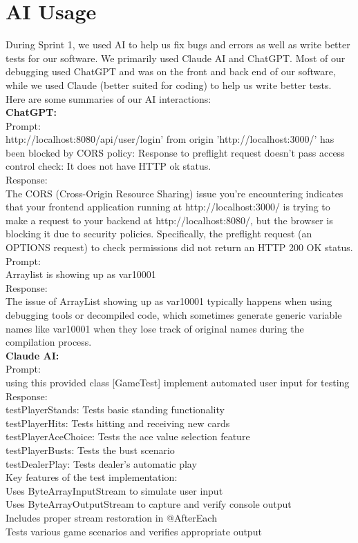 \section{AI Usage}
\setlength{\parindent}{0pt}
During Sprint 1, we used AI to help us fix bugs and errors as well as write better tests for our software. We primarily used Claude AI and ChatGPT. Most of our debugging used ChatGPT and was on the front and back end of our software, while we used Claude (better suited for coding) to help us write better tests.\\

Here are some summaries of our AI interactions:\\

\textbf{ChatGPT:}\\

Prompt:\\
http://localhost:8080/api/user/login' from origin 'http://localhost:3000/' has been blocked by CORS policy: Response to preflight request doesn't pass access control check: It does not have HTTP ok status.\\

Response:\\
The CORS (Cross-Origin Resource Sharing) issue you’re encountering indicates that your frontend application running at http://localhost:3000/ is trying to make a request to your backend at http://localhost:8080/, but the browser is blocking it due to security policies. Specifically, the preflight request (an OPTIONS request) to check permissions did not return an HTTP 200 OK status. \\

Prompt:\\
Arraylist is showing up as var10001\\

Response:\\
The issue of ArrayList showing up as var10001 typically happens when using debugging tools or decompiled code, which sometimes generate generic variable names like var10001 when they lose track of original names during the compilation process.\\

\textbf{Claude AI:}\\

Prompt:\\
using this provided class [GameTest] implement automated user input for testing\\

Response:\\
testPlayerStands: Tests basic standing functionality\\
testPlayerHits: Tests hitting and receiving new cards\\
testPlayerAceChoice: Tests the ace value selection feature\\
testPlayerBusts: Tests the bust scenario\\
testDealerPlay: Tests dealer's automatic play\\

Key features of the test implementation:\\

Uses ByteArrayInputStream to simulate user input\\
Uses ByteArrayOutputStream to capture and verify console output\\
Includes proper stream restoration in @AfterEach\\
Tests various game scenarios and verifies appropriate output\\

\pagebreak
